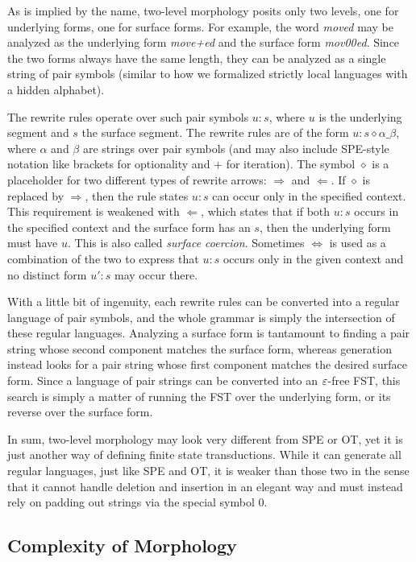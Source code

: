 As is implied by the name, two-level morphology posits only two levels, one for underlying forms, one for surface forms.
For example, the word \emph{moved} may be analyzed as the underlying form \emph{move+ed} and the surface form \emph{mov00ed}.
Since the two forms always have the same length, they can be analyzed as a single string of pair symbols (similar to how we formalized strictly local languages with a hidden alphabet).

The rewrite rules operate over such pair symbols $u:s$, where $u$ is the underlying segment and $s$ the surface segment.
The rewrite rules are of the form $u:s \diamond \alpha \_ \beta$, where $\alpha$ and $\beta$ are strings over pair symbols (and may also include SPE-style notation like brackets for optionality and $+$ for iteration).
The symbol $\diamond$ is a placeholder for two different types of rewrite arrows: $\Rightarrow$ and $\Leftarrow$.
If $\diamond$ is replaced by $\Rightarrow$, then the rule states $u:s$ can occur only in the specified context.
This requirement is weakened with $\Leftarrow$, which states that if both $u:s$ occurs in the specified context and the surface form has an $s$, then the underlying form must have $u$.
This is also called \emph{surface coercion}.
Sometimes $\Leftrightarrow$ is used as a combination of the two to express that $u:s$ occurs only in the given context and no distinct form $u':s$ may occur there.

With a little bit of ingenuity, each rewrite rules can be converted into a regular language of pair symbols, and the whole grammar is simply the intersection of these regular languages.
Analyzing a surface form is tantamount to finding a pair string whose second component matches the surface form, whereas generation instead looks for a pair string whose first component matches the desired surface form.
Since a language of pair strings can be converted into an $\varepsilon$-free FST, this search is simply a matter of running the FST over the underlying form, or its reverse over the surface form.

In sum, two-level morphology may look very different from SPE or OT, yet it is just another way of defining finite state transductions.
While it can generate all regular languages, just like SPE and OT, it is weaker than those two in the sense that it cannot handle deletion and insertion in an elegant way and must instead rely on padding out strings via the special symbol $0$.

\subsection{Complexity of Morphology}

